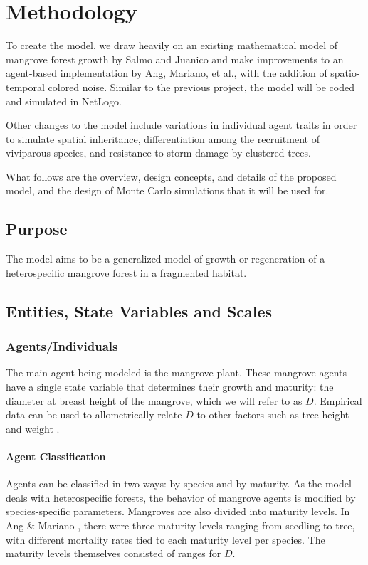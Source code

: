 \section{Methodology}

To create the model, we draw heavily on an existing mathematical model of mangrove forest growth by Salmo and Juanico \cite{mangroveModelPaper} and make improvements to an agent-based implementation by Ang, Mariano, et al.\cite{mangrovesAngMariano}, with the addition of spatio-temporal colored noise. 
Similar to the previous project, the model will be coded and simulated in NetLogo.

Other changes to the model include variations in individual agent traits in order to simulate spatial inheritance, differentiation among the recruitment of viviparous species, and resistance to storm damage by clustered trees.

What follows are the overview, design concepts, and details of the proposed model, and the design of Monte Carlo simulations that it will be used for.

\subsection{Purpose}
The model aims to be a generalized model of growth or regeneration of a heterospecific mangrove forest in a fragmented habitat.

\subsection{Entities, State Variables and Scales}
\subsubsection{Agents/Individuals}
The main agent being modeled is the mangrove plant. These mangrove agents have a single state variable that determines their growth and maturity: the diameter at breast height of the mangrove, which we will refer to as $D$. Empirical data can be used to allometrically relate $D$ to other factors such as tree height and weight \cite{komiyama2005}.

\paragraph{Agent Classification}
Agents can be classified in two ways: by species and by maturity. As the model deals with heterospecific forests, the behavior of mangrove agents is modified by species-specific parameters. Mangroves are also divided into maturity levels. In Ang \& Mariano \cite{mangrovesAngMariano}, there were three maturity levels ranging from seedling to tree, with different mortality rates tied to each maturity level per species. The maturity levels themselves consisted of ranges for $D$.

